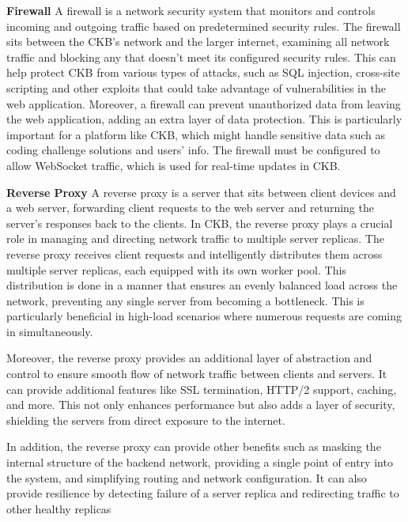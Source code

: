 \textbf{Firewall}\newline
A firewall is a network security system that monitors and controls incoming and outgoing traffic based on predetermined security rules. 
The firewall sits between the CKB’s network and the larger internet, examining all network traffic and blocking any 
that doesn’t meet its configured security rules. This can help protect CKB from various types of attacks, 
such as SQL injection, cross-site scripting and other exploits that could take advantage of vulnerabilities in the web application. 
Moreover, a firewall can prevent unauthorized data from leaving the web application, adding an extra layer of data protection. 
This is particularly important for a platform like CKB, which might handle sensitive data such as coding challenge solutions and users’ info. 
The firewall must be configured to allow WebSocket traffic, which is used for real-time updates in CKB.

\textbf{Reverse Proxy}
A reverse proxy is a server that sits between client devices and a web server, forwarding client requests to the web server and returning the server’s 
responses back to the clients. In CKB, the reverse proxy plays a crucial role in managing and directing network traffic to multiple server replicas. 
The reverse proxy receives client requests and intelligently distributes them across multiple server replicas, each equipped with its own worker pool. 
This distribution is done in a manner that ensures an evenly balanced load across the network, preventing any single server from becoming a bottleneck. 
This is particularly beneficial in high-load scenarios where numerous requests are coming in simultaneously.\newline

Moreover, the reverse proxy provides an additional layer of abstraction and control to ensure smooth flow of network traffic between clients and servers. 
It can provide additional features like SSL termination, HTTP/2 support, caching, and more. This not only enhances performance but also adds a layer of security, 
shielding the servers from direct exposure to the internet.\newline

In addition, the reverse proxy can provide other benefits such as masking the internal structure of the backend network, providing a single point of entry into the system, 
and simplifying routing and network configuration. It can also provide resilience by detecting failure of a server replica and redirecting traffic to other healthy replicas


